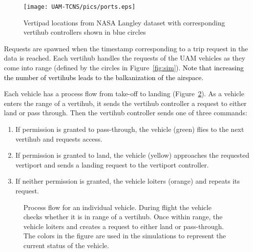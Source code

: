 \begin{figure}[h!]
	\centering
	\texttt{[image: UAM-TCNS/pics/ports.eps]}
	\caption{ Vertipad locations from NASA Langley dataset with corresponding vertihub controllers shown in blue circles}
	\label{fig:vertipadlocations}
\end{figure}


Requests are spawned when the timestamp corresponding to a trip request in the data is reached. Each vertihub handles the requests of the UAM vehicles as they come into range (defined by the circles in Figure~\ref{fig:sim}). \textcolor{black}{Note that increasing the number of vertihubs leads to the balkanization of the airspace.}



Each vehicle has a process flow from take-off to landing (Figure~\ref{fig:aircraftprocess}).
As a vehicle enters the range of a vertihub, it sends the vertihub controller a request to either land or pass through.
Then the vertihub controller sends one of three commands:
\begin{enumerate}
    \item If permission is granted to pass-through, the vehicle (green) flies to the next vertihub and requests access.
    \item If permission is granted to land, the vehicle (yellow) approaches the requested vertiport and sends a landing request to the vertiport controller.
    \item If neither permission is granted, the vehicle loiters (orange) and repeats its request.
 
\end{enumerate}

\begin{figure}
    \centering
    \scalebox{1}{}
    \caption[Process flow for an individual UAM moving through the environment.]{Process flow for an individual vehicle. During flight the vehicle checks whether it is in range of a vertihub. Once within range, the vehicle loiters and creates a request to either land or pass-through. The colors in the figure are used in the simulations to represent the current status of the vehicle.}
    \label{fig:aircraftprocess}
\end{figure}







